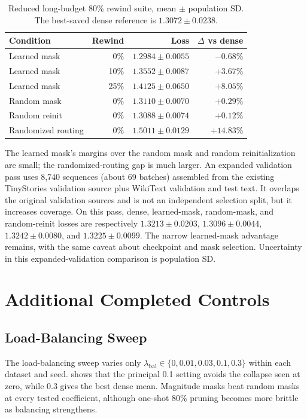 \documentclass{article}
\begin{document}
\begin{table}[t]
\centering
\scriptsize
\caption{Reduced long-budget 80\% rewind suite, mean $\pm$ population SD. The
best-saved dense reference is $1.3072\pm0.0238$.}
\label{tab:app_long_rewind}
\begin{tabular}{@{}lrrr@{}}
\toprule
Condition & Rewind & Loss & $\Delta$ vs dense \\
\midrule
Learned mask & 0\% & $1.2984\pm0.0055$ & $-0.68\%$ \\
Learned mask & 10\% & $1.3552\pm0.0087$ & $+3.67\%$ \\
Learned mask & 25\% & $1.4125\pm0.0650$ & $+8.05\%$ \\
Random mask & 0\% & $1.3110\pm0.0070$ & $+0.29\%$ \\
Random reinit & 0\% & $1.3088\pm0.0074$ & $+0.12\%$ \\
Randomized routing & 0\% & $1.5011\pm0.0129$ & $+14.83\%$ \\
\bottomrule
\end{tabular}
\end{table}

The learned mask's margins over the random mask and random reinitialization are
small; the randomized-routing gap is much larger. An expanded validation pass
uses 8,740 sequences (about 69 batches) assembled from the existing TinyStories
validation source plus WikiText validation and test text. It overlaps the
original validation sources and is not an independent selection split, but it
increases coverage. On this pass, dense, learned-mask, random-mask, and
random-reinit losses are respectively $1.3213\pm0.0203$,
$1.3096\pm0.0044$, $1.3242\pm0.0080$, and $1.3225\pm0.0099$. The narrow
learned-mask advantage remains, with the same caveat about checkpoint and mask
selection. Uncertainty in this expanded-validation comparison is population SD.

\section{Additional Completed Controls}
\label{app:additional_controls}

\subsection{Load-Balancing Sweep}

The load-balancing sweep varies only
$\lambda_{\mathrm{bal}}\in\{0,0.01,0.03,0.1,0.3\}$ within each dataset and
seed.  shows that the principal 0.1 setting avoids
the collapse seen at zero, while 0.3 gives the best dense mean. Magnitude masks
beat random masks at every tested coefficient, although one-shot 80\% pruning
becomes more brittle as balancing strengthens.
\end{document}
